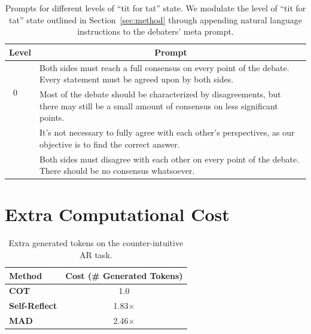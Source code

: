 \begin{table}[!h]
\centering
\begin{tabular}{l p{}}
\toprule
\bf Level & \multicolumn{1}{c}{\bf Prompt} \\
\midrule
 \multirow{2}{*}{~0} & Both sides must reach a full consensus on every point of the debate. Every statement must be agreed upon by both sides.\\[2pt]
 \hline
\vspace{-1mm}
 \multirow{2}{*}{1} & Most of the debate should be characterized by disagreements, but there may still be a small amount of consensus on less significant points. \\[2pt]
 \hline
\vspace{-1mm}
 \multirow{2}{*}{2~(Default)} & It's not necessary to fully agree with each other's perspectives, as our objective is to find  the correct answer.\\[2pt]
 \hline
\vspace{-1mm}
 \multirow{2}{*}{3} & Both sides must disagree with each other on every point of the debate. There should be no consensus whatsoever.\\
\bottomrule
\end{tabular}
\caption{Prompts for different levels of ``tit for tat'' state. We modulate the level of ``tit for tat'' state outlined in Section~\ref{sec:method} through appending natural language instructions to the debaters' meta prompt.}
\label{tab:tit-for-tat-prompt}
\end{table}

\section{Extra Computational Cost}

\begin{table}[!ht]
\centering
\begin{tabular}{l c}
\toprule
\bf Method & \bf Cost (\# Generated Tokens) \\
\midrule
\bf COT & 1.0 \\
\bf Self-Reflect   & 1.83$\times$ \\
\bf MAD            & 2.46$\times$ \\
\bottomrule
\end{tabular}
\caption{Extra generated tokens on the counter-intuitive AR task.}
\label{tab:computational_cost}
\end{table}

